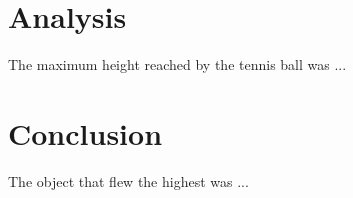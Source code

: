 \documentclass[12pt]{article}
\begin{document}
\section{Analysis}

The maximum height reached by the tennis ball was ...
\\
    

\section{Conclusion}

The object that flew the highest was ... 

    
















\end{document}
